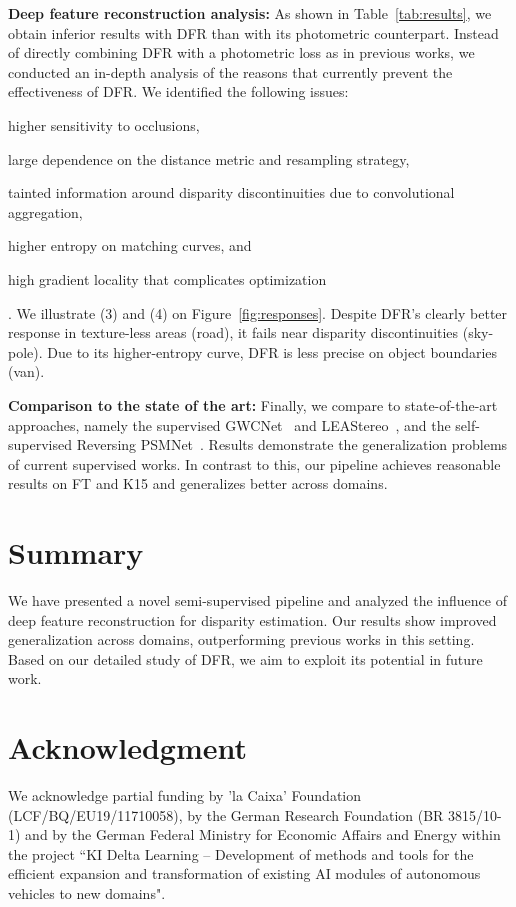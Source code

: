 \documentclass[final]{cvpr}
\begin{document}
\textbf{Deep feature reconstruction analysis:}
As shown in Table~\ref{tab:results}, we obtain inferior results with DFR than with its photometric counterpart. Instead of directly combining DFR with a photometric loss as in previous works, we conducted an in-depth analysis of the reasons that currently prevent the effectiveness of DFR. We identified the following issues: \begin{enumerate*}[label=(\arabic*)] \item higher sensitivity to occlusions, \item large dependence on the distance metric and resampling strategy, \item tainted information around disparity discontinuities due to convolutional aggregation, \item higher entropy on matching curves, and \item high gradient locality that complicates optimization\end{enumerate*}. We illustrate (3) and (4) on Figure~\ref{fig:responses}.
Despite DFR's clearly better response in texture-less areas (road), it fails near disparity discontinuities (sky-pole). Due to its higher-entropy curve, DFR is less precise on object boundaries (van).

\textbf{Comparison to the state of the art:}
Finally, we compare to state-of-the-art approaches, namely the supervised GWCNet~\cite{guo2019gwc} and LEAStereo~\cite{cheng2020hierarchical}, and the self-supervised Reversing PSMNet~\cite{aleotti2020reversing}. Results demonstrate the generalization problems of current supervised works. In contrast to this, our pipeline achieves reasonable results on FT and K15 and generalizes better across domains.

\section{Summary}
We have presented a novel semi-supervised pipeline and analyzed the influence of deep feature reconstruction for disparity estimation. Our results show improved generalization across domains, outperforming previous works in this setting. Based on our detailed study of DFR, we aim to exploit its potential in future work. 

\section*{Acknowledgment}
We acknowledge partial funding by 'la Caixa' Foundation (LCF/BQ/EU19/11710058), by the German Research Foundation (BR 3815/10-1) and by the German Federal Ministry for Economic Affairs and Energy within the project “KI Delta Learning – Development of methods and tools for the efficient expansion and transformation of existing AI modules of autonomous vehicles to new domains".

{\small


}
\end{document}
